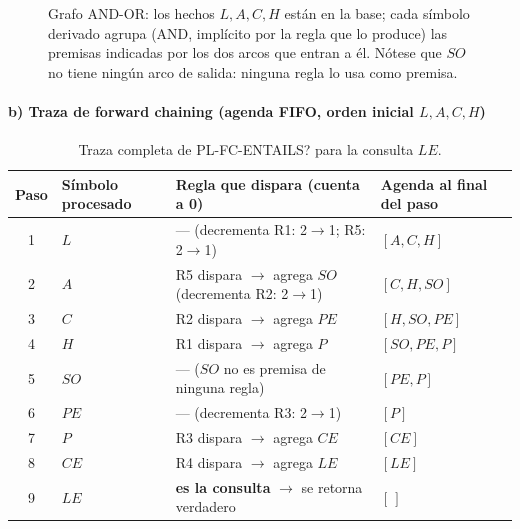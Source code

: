 \begin{figure}[H]
\centering
{}
\caption{Grafo AND-OR: los hechos $L,A,C,H$ están en la base; cada símbolo derivado agrupa (AND,
implícito por la regla que lo produce) las premisas indicadas por los dos arcos que entran a él.
Nótese que $SO$ no tiene ningún arco de salida: ninguna regla lo usa como premisa.}
\end{figure}

\paragraph{b) Traza de forward chaining (agenda FIFO, orden inicial $L,A,C,H$)}

\begin{table}[H]
\centering
\begin{tabular}{clll}
\toprule
Paso & Símbolo procesado & Regla que dispara (cuenta a 0) & Agenda al final del paso \\
\midrule
1 & $L$  & — (decrementa R1: 2$\to$1; R5: 2$\to$1) & $[A,C,H]$ \\
2 & $A$  & R5 dispara $\to$ agrega $SO$ (decrementa R2: 2$\to$1) & $[C,H,SO]$ \\
3 & $C$  & R2 dispara $\to$ agrega $PE$ & $[H,SO,PE]$ \\
4 & $H$  & R1 dispara $\to$ agrega $P$ & $[SO,PE,P]$ \\
5 & $SO$ & — ($SO$ no es premisa de ninguna regla) & $[PE,P]$ \\
6 & $PE$ & — (decrementa R3: 2$\to$1) & $[P]$ \\
7 & $P$  & R3 dispara $\to$ agrega $CE$ & $[CE]$ \\
8 & $CE$ & R4 dispara $\to$ agrega $LE$ & $[LE]$ \\
9 & $LE$ & \textbf{es la consulta} $\to$ se retorna verdadero & $[\,]$ \\
\bottomrule
\end{tabular}
\caption{Traza completa de PL-FC-ENTAILS? para la consulta $LE$.}
\end{table}


